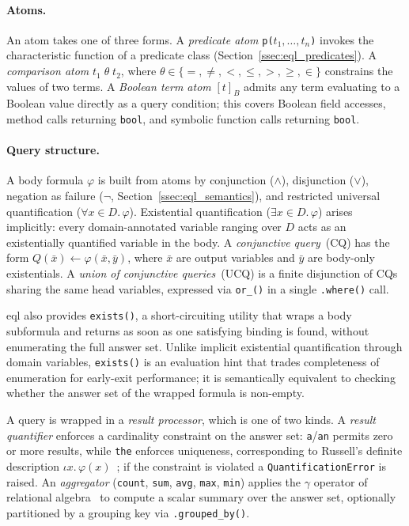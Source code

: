 \documentclass{article}
\begin{document}
\paragraph{Atoms.}
An atom takes one of three forms. A \emph{predicate atom}
\texttt{p($t_1,\ldots,t_n$)} invokes the characteristic function of a
predicate class (Section~\ref{ssec:eql_predicates}). A \emph{comparison
atom} \texttt{$t_1 \;\theta\; t_2$}, where $\theta \in \{=, \neq, <, \leq, >, \geq, \in\}$ constrains the values of two terms. A \emph{Boolean term atom} $[t]_B$ admits any term evaluating to a
Boolean value directly as a query condition; this covers Boolean field
accesses, method calls returning \texttt{bool}, and symbolic function calls
returning \texttt{bool}.

\paragraph{Query structure.}
A body formula $\varphi$ is built from atoms by conjunction ($\wedge$),
disjunction ($\vee$), negation as failure ($\neg$,
Section~\ref{ssec:eql_semantics}), and restricted universal quantification
($\forall x \in D.\,\varphi$). Existential quantification ($\exists x \in
D.\,\varphi$) arises implicitly: every domain-annotated variable ranging over
$D$ acts as an existentially quantified variable in the body. A
\emph{conjunctive query}~(CQ) has the form $Q(\bar{x}) \leftarrow
\varphi(\bar{x}, \bar{y})$, where $\bar{x}$ are output variables and
$\bar{y}$ are body-only existentials. A \emph{union of conjunctive
queries}~(UCQ) is a finite disjunction of CQs sharing the same head
variables, expressed via \texttt{or\_()} in a single \texttt{.where()} call.

\ac{eql} also provides \texttt{exists()}, a short-circuiting utility that
wraps a body subformula and returns as soon as one satisfying binding is
found, without enumerating the full answer set. Unlike implicit existential
quantification through domain variables, \texttt{exists()} is an evaluation
hint that trades completeness of enumeration for early-exit performance; it
is semantically equivalent to checking whether the answer set of the wrapped
formula is non-empty.

A query is wrapped in a \emph{result processor}, which is one of two kinds.
A \emph{result quantifier} enforces a cardinality constraint on the answer
set: \texttt{a}/\texttt{an} permits zero or more results, while \texttt{the}
enforces uniqueness, corresponding to Russell's definite description $\iota
x.\,\varphi(x)$~\cite{WhiteheadRussell1910}; if the constraint is violated a
\texttt{QuantificationError} is raised. An \emph{aggregator}
(\texttt{count}, \texttt{sum}, \texttt{avg}, \texttt{max}, \texttt{min})
applies the $\gamma$ operator of relational
algebra~\cite{Klug1982,AbiteboulHullVianu1995} to compute a scalar summary
over the answer set, optionally partitioned by a grouping key via
\texttt{.grouped\_by()}.
\end{document}

